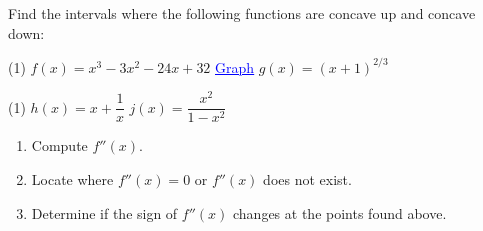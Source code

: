 \documentclass[../mathNotesPreamble]{subfiles}
\begin{document}
  \begin{ex*}
    Find the intervals where the following functions are concave up and concave down:
  \end{ex*}
  \begin{extasks}[after-item-skip=\stretch{1}](1)
    \task $f(x)=x^3-3x^2-24x+32$ \hfill \href{https://www.desmos.com/calculator/re1imdb5c4}{\textcolor{blue}{\underline{Graph}}}
    \task $g(x)=(x+1)^{2/3}$
  \end{extasks}
  \pagebreak

  \begin{extasks}[after-item-skip=\stretch{1}](1)
    \task $h(x)=x+\dfrac{1}{x}$
    \task $j(x)=\dfrac{x^2}{1-x^2}$
  \end{extasks}
  \pagebreak

  \begin{thmBox*}
    \begin{enumerate}
      \item Compute $f''(x)$.
      \item Locate where $f''(x)=0$ or $f''(x)$ does not exist.
      \item Determine if the sign of $f''(x)$ changes at the points found above.
    \end{enumerate}
  \end{thmBox*}
\end{document}
